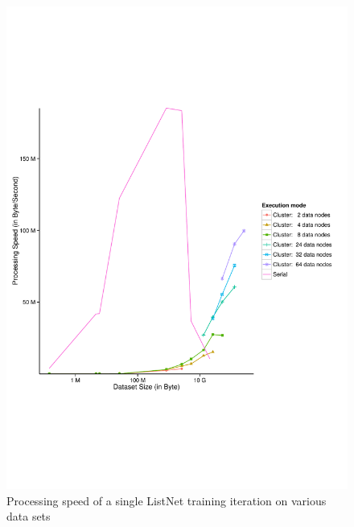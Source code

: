 \begin{figure}
\centering
\includegraphics[trim=5cm 5cm 0cm 5cm, scale=0.8]{gfx/processing_speed_single_logx.pdf}
\caption{Processing speed of a single ListNet training iteration on various data sets}
\label{fig:listnet_processing_speed}
\end{figure}
